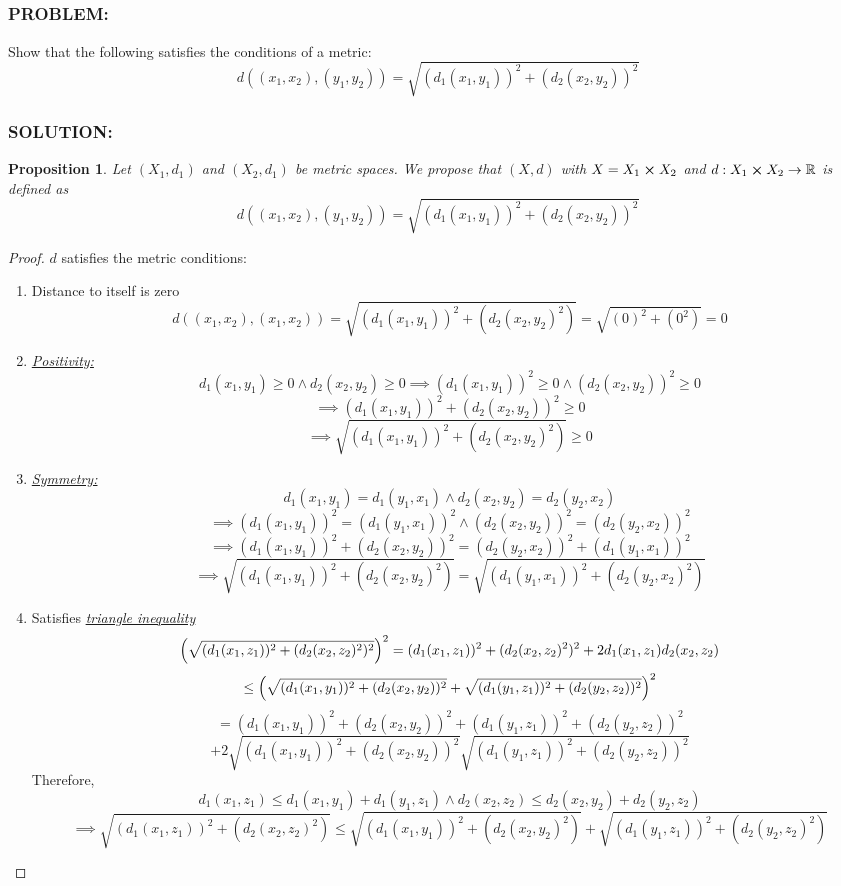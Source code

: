 \documentclass[]{article}
\newcommand{\Problem}{\subsubsection*{\textbf{PROBLEM:}}}
\newcommand{\Solution}{\subsubsection*{\textbf{SOLUTION:}}}
\newcommand{\R}{\mathbb{R}}
\newtheorem{proposition}{Proposition}
\begin{document}
\subsection{}
\Problem
Show that the following satisfies the conditions of a metric: \[
    d((x_1, x_2), (y_1, y_2)) = \sqrt{(d_1(x_1,y_1))^2 + (d_2(x_2,y_2))^2}
\]

\Solution
\begin{proposition}
    Let $(X_1,d_1)$ and $(X_2,d_1)$ be metric spaces.
    We propose that $(X, d)$ with $X = X_1 \cross X_2$ and $d :  X_1 \cross X_2 \to \R$ is defined as \[
        d((x_1, x_2), (y_1, y_2)) = \sqrt{(d_1(x_1,y_1))^2 + (d_2(x_2,y_2))^2}
    \]
\end{proposition}
\begin{proof}
    $d$ satisfies the metric conditions:
    \begin{enumerate}
        \item Distance to itself is zero \[
            d((x_1, x_2), (x_1, x_2)) = \sqrt{(d_1(x_1,y_1))^2 + (d_2(x_2,y_2)^2)} = \sqrt{(0)^2 + (0^2)} = 0
        \] \item \emph{\underline{Positivity:}} \[
            d_1(x_1,y_1) \geq 0 \land d_2(x_2, y_2) \geq 0 
            \implies (d_1(x_1,y_1))^2 \geq 0 \land (d_2(x_2, y_2))^2 \geq 0
        \]\[    
            \implies (d_1(x_1,y_1))^2 + (d_2(x_2, y_2))^2 \geq 0
        \]\[
            \implies \sqrt{(d_1(x_1,y_1))^2 + (d_2(x_2,y_2)^2)} \geq 0
        \]
         \item \emph{\underline{Symmetry:}} \[
            d_1(x_1,y_1) = d_1(y_1,x_1) \land d_2(x_2, y_2) = d_2(y_2,x_2)
        \]\[
            \implies (d_1(x_1,y_1))^2 = (d_1(y_1,x_1))^2 \land (d_2(x_2, y_2))^2 = (d_2(y_2,x_2))^2
        \]\[
            \implies (d_1(x_1,y_1))^2  + (d_2(x_2, y_2))^2 = (d_2(y_2,x_2))^2 + (d_1(y_1,x_1))^2
        \]\[
            \implies \sqrt{(d_1(x_1,y_1))^2 + (d_2(x_2,y_2)^2)} = \sqrt{(d_1(y_1,x_1))^2 + (d_2(y_2,x_2)^2)}
        \] \item Satisfies \emph{\underline{triangle inequality}} \[
            \qty(\sqrt{(d_1(x_1,z_1))^2 + (d_2(x_2,z_2)^2)^2})^2 = (d_1(x_1,z_1))^2 + (d_2(x_2,z_2)^2)^2 + 2 d_1(x_1,z_1) d_2(x_2,z_2)
        \]\[
            \leq \qty(\sqrt{(d_1(x_1,y_1))^2 + (d_2(x_2,y_2))^2} + \sqrt{(d_1(y_1,z_1))^2 + (d_2(y_2,z_2))^2})^2 
        \]\[
            = (d_1(x_1,y_1))^2 + (d_2(x_2,y_2))^2 + (d_1(y_1,z_1))^2 + (d_2(y_2,z_2))^2 
            \]\[+ 2 \sqrt{(d_1(x_1,y_1))^2 + (d_2(x_2,y_2))^2} \sqrt{(d_1(y_1,z_1))^2 + (d_2(y_2,z_2))^2}
        \] Therefore, \[
            d_1(x_1,z_1) \leq d_1(x_1,y_1) + d_1(y_1,z_1) \land d_2(x_2,z_2) \leq d_2(x_2,y_2) + d_2(y_2,z_2) 
        \]\[
            \implies \sqrt{(d_1(x_1,z_1))^2 + (d_2(x_2,z_2)^2)} \leq \sqrt{(d_1(x_1,y_1))^2 + (d_2(x_2,y_2)^2)} + \sqrt{(d_1(y_1,z_1))^2 + (d_2(y_2,z_2)^2)}
        \]
    \end{enumerate}
\end{proof}
\end{document}

